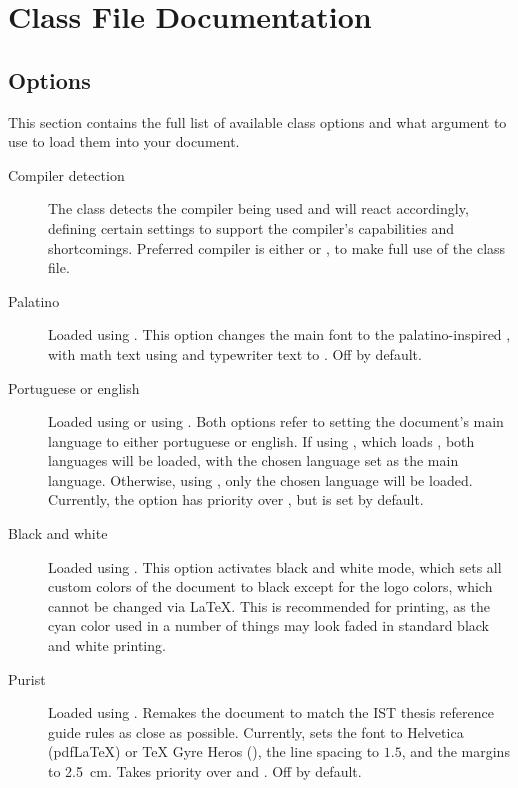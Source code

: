 \documentclass[palatino,english]{ist-report}
\begin{document}
\section{Class File Documentation}

\subsection{Options}\label{sec:options}

This section contains the full list of available class options and what argument to use to load them into your document.
\begin{description}
	\item [Compiler detection] The class detects the compiler being used and will react accordingly, defining certain settings to support the compiler's capabilities and shortcomings. Preferred compiler is either \XeLaTeX{} or \LuaLaTeX{}, to make full use of the class file\footnotemark{}. 
	\item [Palatino] Loaded using . This option changes the main font to the palatino-inspired , with math text using  and typewriter text to . Off by default.
	\item [Portuguese or english] Loaded using  or using . Both options refer to setting the document's main language to either portuguese or english. If using \XeLaTeX{}, which loads , both languages will be loaded, with the chosen language set as the main language. Otherwise, using , only the chosen language will be loaded. Currently, the  option has priority over , but  is set by default.
	\item [Black and white] Loaded using . This option activates black and white mode, which sets all custom colors of the document to black except for the logo colors, which cannot be changed via \LaTeX{}. This is recommended for printing, as the cyan color used in a number of things may look faded in standard black and white printing.
	\item [Purist] Loaded using . Remakes the document to match the IST thesis reference guide rules as close as possible. Currently, sets the font to Helvetica (pdf\LaTeX{}) or \TeX{} Gyre Heros (\XeLaTeX{}), the line spacing to $1.5$, and the margins to \SI{2.5}{\centi\meter}. Takes priority over  and . Off by default.

\end{description}
\end{document}
